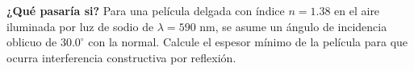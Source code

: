\item \textbf{¿Qué pasaría si?} Para una película delgada con índice $n = 1.38$ en el aire iluminada por luz de sodio de $\lambda = 590\text{ nm}$, se asume un ángulo de incidencia oblicuo de $30.0^\circ$ con la normal. Calcule el espesor mínimo de la película para que ocurra interferencia constructiva por reflexión.